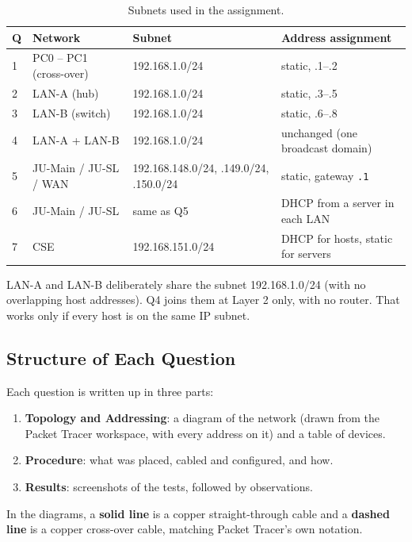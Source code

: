 \documentclass[11pt]{article}
\begin{document}
\begin{table}[H]
\centering
\small
\begin{tabular}{llp{4.3cm}l}
\toprule
\textbf{Q} & \textbf{Network} & \textbf{Subnet} & \textbf{Address assignment} \\
\midrule
1 & PC0 -- PC1 (cross-over) & 192.168.1.0/24 & static, .1--.2 \\
2 & LAN-A (hub) & 192.168.1.0/24 & static, .3--.5 \\
3 & LAN-B (switch) & 192.168.1.0/24 & static, .6--.8 \\
4 & LAN-A + LAN-B & 192.168.1.0/24 & unchanged (one broadcast domain) \\
5 & JU-Main / JU-SL / WAN & 192.168.148.0/24, .149.0/24, .150.0/24 & static, gateway \texttt{.1} \\
6 & JU-Main / JU-SL & same as Q5 & DHCP from a server in each LAN \\
7 & CSE & 192.168.151.0/24 & DHCP for hosts, static for servers \\
\bottomrule
\end{tabular}
\caption{Subnets used in the assignment.}
\label{tab:plan}
\end{table}

LAN-A and LAN-B deliberately share the subnet 192.168.1.0/24 (with no overlapping host
addresses). Q4 joins them at Layer 2 only, with no router. That works only if every host is
on the same IP subnet.

\subsection{Structure of Each Question}
Each question is written up in three parts:
\begin{enumerate}[leftmargin=1.8em]
  \item \textbf{Topology and Addressing}: a diagram of the network (drawn from the Packet
  Tracer workspace, with every address on it) and a table of devices.
  \item \textbf{Procedure}: what was placed, cabled and configured, and how.
  \item \textbf{Results}: screenshots of the tests, followed by observations.
\end{enumerate}
In the diagrams, a \textbf{solid line} is a copper straight-through cable and a
\textbf{dashed line} is a copper cross-over cable, matching Packet Tracer's own notation.

\end{document}
